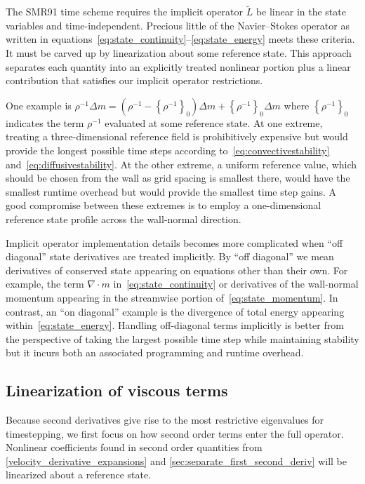 \documentclass[letterpaper,11pt,nointlimits,reqno,draft]{amsbook}
\newcommand{\reference}[1]{\ensuremath{\left\{#1\right\}_{0}}}
\newcommand{\lessreference}[1]
  {\ensuremath{\left({#1}-\reference{#1}\right)}}
\begin{document}
The SMR91 time scheme requires the implicit operator $\tilde{L}$ be linear in
the state variables and time-independent.  Precious little of the
Navier--Stokes operator as written in
equations~\eqref{eq:state_continuity}--\eqref{eq:state_energy} meets these
criteria.  It must be carved up by linearization about some reference state.
This approach separates each quantity into an explicitly treated nonlinear
portion plus a linear contribution that satisfies our implicit operator
restrictions.

One example is $\rho^{-1}\Delta{}m = \lessreference{\rho^{-1}}\Delta{}m +
\reference{\rho^{-1}}\Delta{}m$ where $\reference{\rho^{-1}}$ indicates the
term $\rho^{-1}$ evaluated at some reference state.  At one extreme, treating a
three-dimensional reference field is prohibitively expensive but would provide
the longest possible time steps according to~\eqref{eq:convectivestability}
and~\eqref{eq:diffusivestability}.  At the other extreme, a uniform reference
value, which should be chosen from the wall as grid spacing is smallest there,
would have the smallest runtime overhead but would provide the smallest time
step gains.  A good compromise between these extremes is to employ a
one-dimensional reference state profile across the wall-normal direction.

Implicit operator implementation details becomes more complicated when ``off
diagonal'' state derivatives are treated implicitly.  By ``off diagonal'' we
mean derivatives of conserved state appearing on equations other than their
own.  For example, the term $\nabla\cdot{}m$ in~\eqref{eq:state_continuity} or
derivatives of the wall-normal momentum appearing in the streamwise portion
of~\eqref{eq:state_momentum}.  In contrast, an ``on diagonal'' example is the
divergence of total energy appearing within~\eqref{eq:state_energy}.  Handling
off-diagonal terms implicitly is better from the perspective of taking the
largest possible time step while maintaining stability but it incurs both an
associated programming and runtime overhead.

\subsection{Linearization of viscous terms}

Because second derivatives give rise to the most restrictive eigenvalues for
timestepping, we first focus on how second order terms enter the full operator.
Nonlinear coefficients found in second order quantities from
\autoref{velocity_derivative_expansions} and
\autoref{sec:separate_first_second_deriv} will be linearized about a reference
state.
\end{document}
